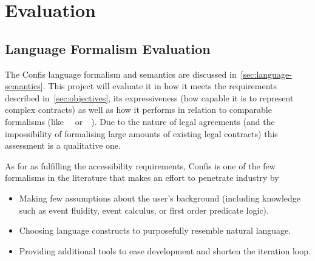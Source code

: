 
\chapter{Evaluation}\label{ch:evaluation}


\section{Language Formalism Evaluation}\label{sec:language-formalism-evaluation}









%

The Confis language formalism and semantics are discussed in~\autoref{sec:language-semantics}.
This project will evaluate it in how it meets the requirements described in~\autoref{sec:objectives}, its expressiveness (how capable it is to represent complex contracts) as well as how it performs in relation to comparable formalisms (like~~\cite{symboleo2020} or~~\cite{accordHomepage}).
Due to the nature of legal agreements (and the impossibility of formalising large amounts of existing legal contracts) this assessment is a qualitative one.

As for as fulfilling the accessibility requirements, Confis is one of the few formalisms in the literature that makes an effort to penetrate industry by
\begin{itemize}
    \item Making few assumptions about the user's background (including knowledge such as event fluidity, event calculus, or first order predicate logic).
    \item Choosing language constructs to purposefully resemble natural language.
    \item Providing additional tools to ease development and shorten the iteration loop.
\end{itemize}


